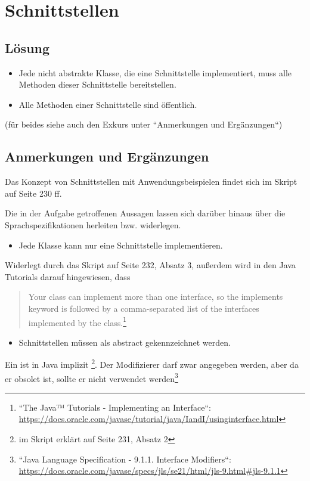 \chapter{Schnittstellen}

\section*{Lösung}

\begin{itemize}
    \item Jede nicht abstrakte Klasse, die eine Schnittstelle implementiert, muss alle Methoden dieser Schnittstelle bereitstellen.
    \item Alle Methoden einer Schnittstelle sind öffentlich.
\end{itemize}

(für beides siehe auch den Exkurs unter ``Anmerkungen und Ergänzungen``)

\section*{Anmerkungen und Ergänzungen}

Das Konzept von Schnittstellen mit Anwendungsbeispielen findet sich im Skript auf Seite 230 ff.

Die in der Aufgabe getroffenen Aussagen lassen sich darüber hinaus über die Sprachspezifikationen herleiten bzw. widerlegen.

\begin{itemize}
    \item Jede Klasse kann nur eine Schnittstelle implementieren.
\end{itemize}

Widerlegt durch das Skript auf Seite 232, Absatz 3, außerdem wird in den Java Tutorials darauf hingewiesen, dass
\blockquote{
    Your class can implement more than one interface, so the implements keyword is followed by a comma-separated list of the interfaces implemented by the class.\footnote{``The Java™ Tutorials - Implementing an Interface``: \url{https://docs.oracle.com/javase/tutorial/java/IandI/usinginterface.html}}
}


\begin{itemize}
    \item Schnittstellen müssen als abstract gekennzeichnet werden.
\end{itemize}

Ein  ist in Java implizit \footnote{im Skript erklärt auf Seite 231, Absatz 2}.
Der Modifizierer darf zwar angegeben werden, aber da er obsolet ist, sollte er nicht verwendet werden\footnote{
``Java Language Specification - 9.1.1. Interface Modifiers``: \url{https://docs.oracle.com/javase/specs/jls/se21/html/jls-9.html#jls-9.1.1}
}

